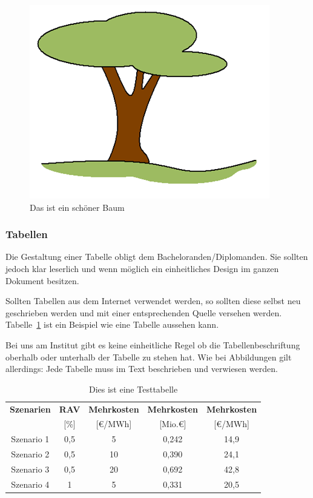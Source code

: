 \begin{figure}[H]
	\begin{center}
		\includegraphics{Abbildungen/Baum.png}
		\caption{Das ist ein schöner Baum}
		\label{fig:Baum}
	\end{center}
\end{figure}


\subsubsection{Tabellen}

Die Gestaltung einer Tabelle obligt dem Bacheloranden/Diplomanden. Sie sollten jedoch klar leserlich und wenn möglich ein einheitliches Design im ganzen Dokument besitzen.

Sollten Tabellen aus dem Internet verwendet werden, so sollten diese selbst neu geschrieben werden und mit einer entsprechenden Quelle versehen werden. Tabelle~\ref{tab:Tabelle1} ist ein Beispiel wie eine Tabelle aussehen kann.

Bei uns am Institut gibt es keine einheitliche Regel ob die Tabellenbeschriftung oberhalb oder unterhalb der Tabelle zu stehen hat. Wie bei Abbildungen gilt allerdings: Jede Tabelle muss im Text beschrieben und verwiesen werden.

\begin{table}[H]
	\centering 
	\begin{tabular}{c c c c c}
		\hline
		\textbf{Szenarien}		& \textbf{RAV } 		& \textbf{Mehrkosten}	& \textbf{Mehrkosten}	& \textbf{Mehrkosten}	\\	
		& [\%]       			& [\euro/MWh]  			& [Mio.\euro] 			& [\euro/MWh] 			\\
		\hline
		\rowcolor[gray]{0.9}
		Szenario 1				& 0,5	 				& 5						& 0,242					& 14,9					\\
		Szenario 2				& 0,5	  				& 10					& 0,390					& 24,1					\\
		\rowcolor[gray]{0.9}
		Szenario 3				& 0,5   				& 20					& 0,692					& 42,8					\\
		Szenario 4				& 1	  					& 5						& 0,331					& 20,5					\\
		\hline \hline
	\end{tabular}
	\caption{Dies ist eine Testtabelle}\label{tab:Tabelle1}
\end{table}



